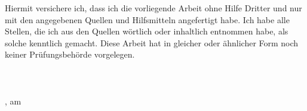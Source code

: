 Hiermit versichere ich, dass ich die vorliegende Arbeit ohne Hilfe Dritter und nur mit den angegebenen Quellen und
Hilfsmitteln angefertigt habe. Ich habe alle Stellen, die ich aus den Quellen wörtlich oder inhaltlich entnommen habe,
als solche kenntlich gemacht. Diese Arbeit hat in gleicher oder ähnlicher Form noch keiner Prüfungsbehörde vorgelegen.\\
\\
\\
\\
\ort, am \datum

